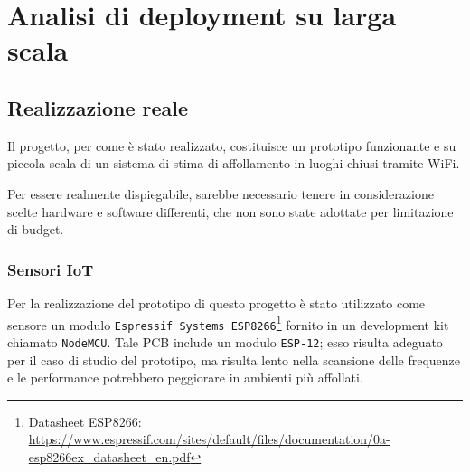 \section{Analisi di deployment su larga scala}




\subsection{Realizzazione reale}

Il progetto, per come è stato realizzato, costituisce un prototipo funzionante e su piccola scala di un sistema di stima di affollamento in luoghi chiusi tramite WiFi.

Per essere realmente dispiegabile, sarebbe necessario tenere in considerazione scelte hardware e software differenti, che non sono state adottate per limitazione di budget.

\subsubsection{Sensori IoT}\label{subsub:deploy:real:iot}

Per la realizzazione del prototipo di questo progetto è stato utilizzato come sensore un modulo \texttt{Espressif Systems ESP8266}\footnote{Datasheet ESP8266: \url{https://www.espressif.com/sites/default/files/documentation/0a-esp8266ex_datasheet_en.pdf}} fornito in un development kit chiamato \texttt{NodeMCU}.
Tale PCB include un modulo \texttt{ESP-12};
esso risulta adeguato per il caso di studio del prototipo, ma risulta lento nella scansione delle frequenze e le performance potrebbero peggiorare in ambienti più affollati.

